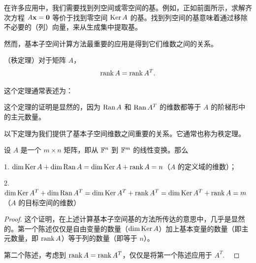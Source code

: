 在许多应用中，我们需要找到列空间或零空间的基。例如，正如前面所示，求解齐次方程 $A \mathbf{x} = \mathbf{0}$ 等价于找到零空间 $\operatorname{Ker} A$ 的基。找到列空间的基意味着通过移除不必要的（列）向量，来从生成集中提取基。

然而，基本子空间计算方法最重要的应用是得到它们维数之间的关系。

\begin{theorem}\label{stmt:02-07-01} （秩定理）对于矩阵 $A$，
$$\operatorname{rank} A = \operatorname{rank} A^T.$$\end{theorem}

这个定理通常表述为：


这个定理的证明是显然的，因为 $\operatorname{Ran} A$ 和 $\operatorname{Ran} A^T$ 的维数都等于 $A$ 的阶梯形中的主元数量。

以下定理为我们提供了基本子空间维数之间重要的关系。它通常也称为秩定理。

\begin{theorem}\label{stmt:02-07-02}  设 $A$ 是一个 $m \times n$ 矩阵，即从 $\mathbb{F}^n$ 到 $\mathbb{F}^m$ 的线性变换。那么

1. $\dim \operatorname{Ker} A + \dim \operatorname{Ran} A = \dim \operatorname{Ker} A + \operatorname{rank} A = n$（$A$ 的定义域的维数）；

2. $\dim \operatorname{Ker} A^T + \dim \operatorname{Ran} A^T = \dim \operatorname{Ker} A^T + \operatorname{rank} A^T = \dim \operatorname{Ker} A^T + \operatorname{rank} A = m$（$A$ 的目标空间的维数）\end{theorem}

\begin{proof} 这个证明，在上述计算基本子空间基的方法所传达的意思中，几乎是显然的。第一个陈述仅仅是自由变量的数量（$\dim \operatorname{Ker} A$）加上基本变量的数量（即主元数量，即 $\operatorname{rank} A$）等于列的数量（即等于 $n$）。

第二个陈述，考虑到 $\operatorname{rank} A = \operatorname{rank} A^T$，仅仅是将第一个陈述应用于 $A^T$. ~\end{proof}

